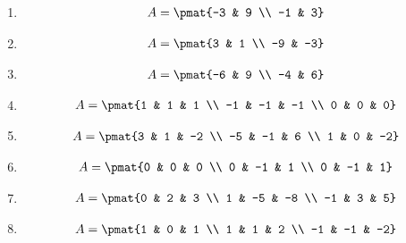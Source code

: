 \begin{enumerate}
\item

\begin{align*}
A = \pmat{-3 & 9 \\ -1 & 3}
\end{align*}

\item

\begin{align*}
A = \pmat{3 & 1 \\ -9 & -3}
\end{align*}

\item

\begin{align*}
A = \pmat{-6 & 9 \\ -4 & 6}
\end{align*}

\item

\begin{align*}
A = \pmat{1 & 1 & 1 \\ -1 & -1 & -1 \\ 0 & 0 & 0}
\end{align*}

\item

\begin{align*}
A = \pmat{3 & 1 & -2 \\ -5 & -1 & 6 \\ 1 & 0 & -2}
\end{align*}

\item

\begin{align*}
A = \pmat{0 & 0 & 0 \\ 0 & -1 & 1 \\ 0 & -1 & 1}
\end{align*}

\item

\begin{align*}
A = \pmat{0 & 2 & 3 \\ 1 & -5 & -8 \\ -1 & 3 & 5}
\end{align*}

\item

\begin{align*}
A = \pmat{1 & 0 & 1 \\ 1 & 1 & 2 \\ -1 & -1 & -2}
\end{align*}


\end{enumerate}
